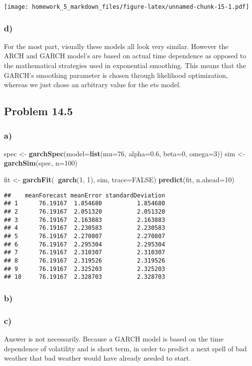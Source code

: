 \documentclass[]{article}
\newenvironment{Shaded}{\begin{snugshade}}{\end{snugshade}}
\newcommand{\KeywordTok}[1]{\textcolor[rgb]{0.13,0.29,0.53}{\textbf{#1}}}
\newcommand{\DataTypeTok}[1]{\textcolor[rgb]{0.13,0.29,0.53}{#1}}
\newcommand{\DecValTok}[1]{\textcolor[rgb]{0.00,0.00,0.81}{#1}}
\newcommand{\FloatTok}[1]{\textcolor[rgb]{0.00,0.00,0.81}{#1}}
\newcommand{\StringTok}[1]{\textcolor[rgb]{0.31,0.60,0.02}{#1}}
\newcommand{\OtherTok}[1]{\textcolor[rgb]{0.56,0.35,0.01}{#1}}
\newcommand{\OperatorTok}[1]{\textcolor[rgb]{0.81,0.36,0.00}{\textbf{#1}}}
\newcommand{\NormalTok}[1]{#1}
\begin{document}
\texttt{[image: homework\_5\_markdown\_files/figure-latex/unnamed-chunk-15-1.pdf]}

\subsubsection{d)}\label{d}

For the most part, visually these models all look very similar. However
the ARCH and GARCH model's are based on actual time dependence as
opposed to the mathematical strategies used in exponential smoothing.
This means that the GARCH's smoothing parameter is chosen through
likelihood optimization, whereas we just chose an arbitrary value for
the ets model.

\subsection{Problem 14.5}\label{problem-14.5}

\subsubsection{a)}\label{a-1}

\begin{Shaded}
\begin{Highlighting}[]
\NormalTok{spec <-}\StringTok{ }\KeywordTok{garchSpec}\NormalTok{(}\DataTypeTok{model=}\KeywordTok{list}\NormalTok{(}\DataTypeTok{mu=}\DecValTok{76}\NormalTok{, }\DataTypeTok{alpha=}\FloatTok{0.6}\NormalTok{, }\DataTypeTok{beta=}\DecValTok{0}\NormalTok{, }\DataTypeTok{omega=}\DecValTok{3}\NormalTok{))}
\NormalTok{sim <-}\StringTok{ }\KeywordTok{garchSim}\NormalTok{(spec, }\DataTypeTok{n=}\DecValTok{100}\NormalTok{)}

\NormalTok{fit <-}\StringTok{ }\KeywordTok{garchFit}\NormalTok{(}\OperatorTok{~}\KeywordTok{garch}\NormalTok{(}\DecValTok{1}\NormalTok{, }\DecValTok{1}\NormalTok{), sim, }\DataTypeTok{trace=}\OtherTok{FALSE}\NormalTok{)}
\KeywordTok{predict}\NormalTok{(fit, }\DataTypeTok{n.ahead=}\DecValTok{10}\NormalTok{)}
\end{Highlighting}
\end{Shaded}

\begin{verbatim}
##    meanForecast meanError standardDeviation
## 1      76.19167  1.854680          1.854680
## 2      76.19167  2.051320          2.051320
## 3      76.19167  2.163883          2.163883
## 4      76.19167  2.230583          2.230583
## 5      76.19167  2.270807          2.270807
## 6      76.19167  2.295304          2.295304
## 7      76.19167  2.310307          2.310307
## 8      76.19167  2.319526          2.319526
## 9      76.19167  2.325203          2.325203
## 10     76.19167  2.328703          2.328703
\end{verbatim}

\subsubsection{b)}\label{b-1}

\subsubsection{c)}\label{c-1}

Answer is not necessarily. Because a GARCH model is based on the time
dependence of volatility and is short term, in order to predict a next
spell of bad weather that bad weather would have already needed to
start.
\end{document}
